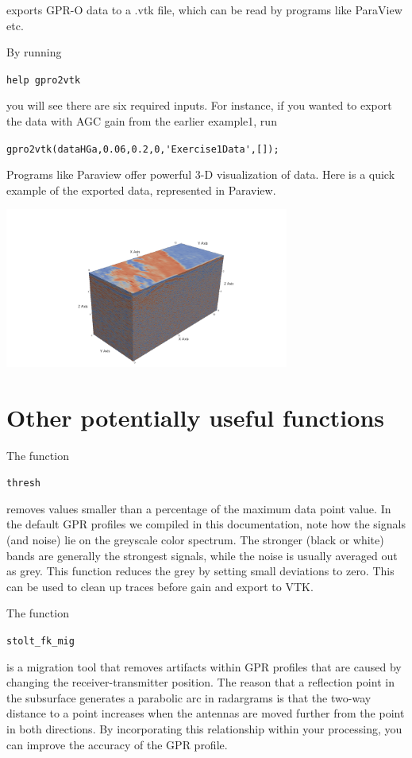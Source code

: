 \documentclass[11pt]{article}
\begin{document}
exports GPR-O data to a .vtk file, which can be
read by programs like ParaView etc.

By running

\qquad \verb#help gpro2vtk#

you will see there are six required inputs. For instance, if you
wanted to export the data with AGC gain from the earlier example1, run

\qquad \verb#gpro2vtk(dataHGa,0.06,0.2,0,'Exercise1Data',[]);#

Programs like Paraview offer powerful 3-D visualization of data.
Here is a quick example of the exported data, represented in Paraview.

\begin{center}
\includegraphics[width=0.7\textwidth, trim = 1cm 3cm 1cm
  3cm,clip]{figures/ParaviewEx.png}
\end{center}

\section{Other potentially useful functions}

The function

\qquad \verb#thresh#

removes values smaller than a percentage of the maximum data point
value. In the default GPR profiles we compiled in this documentation,
note how the signals (and noise) lie on the greyscale color spectrum. The
stronger (black or white) bands are generally the strongest signals,
while the noise is usually averaged out as grey. This function reduces
the grey by setting small deviations to zero. This can be used to 
clean up traces before gain and export to VTK.

The function

\qquad \verb#stolt_fk_mig#

is a migration tool that removes artifacts within GPR profiles that are
caused by changing the receiver-transmitter position. The reason that a
reflection point in the subsurface generates a parabolic arc in radargrams
is that the two-way distance to a point increases when the antennas are moved
further from the point in both directions. By incorporating this relationship
within your processing, you can improve the accuracy of the GPR profile.
\end{document}
